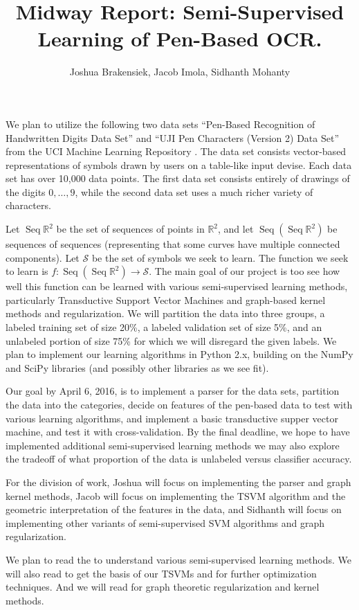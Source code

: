 \documentclass[11pt]{article}
\title{Midway Report: Semi-Supervised Learning of Pen-Based OCR.}
\author{Joshua Brakensiek, Jacob Imola, Sidhanth Mohanty}
\begin{document}
\maketitle

\newcommand{\Seq}{\operatorname{Seq}}

We plan to utilize the following two data sets ``Pen-Based Recognition of Handwritten Digits Data Set'' \cite{Alpaydin:1998} and  ``UJI Pen Characters (Version 2) Data Set'' \cite{Llorens:2008} from the UCI Machine Learning Repository \cite{Lichman:2013}. The data set consists vector-based representations of symbols drawn by users on a table-like input devise. Each data set has over 10,000 data points. The first data set consists entirely of drawings of the digits $0, \hdots, 9$, while the second data set uses a much richer variety of characters.

Let $\Seq \mathbb R^2$ be the set of sequences of points in $\mathbb R^2$, and let $\Seq (\Seq \mathbb R^2)$ be sequences of sequences (representing that some curves have multiple connected components). Let $\mathcal S$ be the set of symbols we seek to learn. The function we seek to learn is $f : \Seq (\Seq \mathbb R^2) \to \mathcal S$. The main goal of our project is too see how well this function can be learned with various semi-supervised learning methods, particularly Transductive Support Vector Machines and graph-based kernel methods and regularization. We will partition the data into three groups, a labeled training set of size 20\%, a labeled validation set of size 5\%, and an unlabeled portion of size 75\% for which we will disregard the given labels. We plan to implement our learning algorithms in Python 2.x, building on the NumPy and SciPy libraries (and possibly other libraries as we see fit).

Our goal by April 6, 2016, is to implement a parser for the data sets, partition the data into the categories, decide on features of the pen-based data to test with various learning algorithms, and implement a basic transductive supper vector machine, and test it with cross-validation. By the final deadline, we hope to have implemented additional semi-supervised learning methods we may also explore the tradeoff of what proportion of the data is unlabeled versus classifier accuracy.

For the division of work, Joshua will focus on implementing the parser and graph kernel methods, Jacob will focus on implementing the TSVM
algorithm and the geometric interpretation of the features in the data, and Sidhanth will focus on implementing other variants of semi-supervised
SVM algorithms and graph regularization. 

We plan to read the \cite{Zhu:2005} to understand various semi-supervised learning methods. We will also read \cite{chapelle2006continuation}
to get the basis of our TSVMs and \cite{chapelle2008optimization} for further optimization techniques. And we will read \cite{smola2003kernels}
for graph theoretic regularization and kernel methods.



\end{document}
